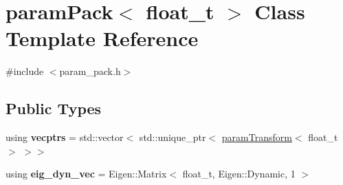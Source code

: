 \hypertarget{classparamPack}{}\section{param\+Pack$<$ float\+\_\+t $>$ Class Template Reference}
\label{classparamPack}


{\ttfamily \#include $<$param\+\_\+pack.\+h$>$}

\subsection*{Public Types}
\begin{DoxyCompactItemize}
\item 
\mbox{\label{classparamPack_a7af90cb7604e5816be45fa5c4032f5ea}} 
using {\bfseries vecptrs} = std\+::vector$<$ std\+::unique\+\_\+ptr$<$ \hyperlink{classparamTransform}{param\+Transform}$<$ float\+\_\+t $>$ $>$$>$
\item 
\mbox{\label{classparamPack_a02e7f06874b3cc6e4488e52a30d10bf9}} 
using {\bfseries eig\+\_\+dyn\+\_\+vec} = Eigen\+::\+Matrix$<$ float\+\_\+t, Eigen\+::\+Dynamic, 1 $>$
\end{DoxyCompactItemize}
